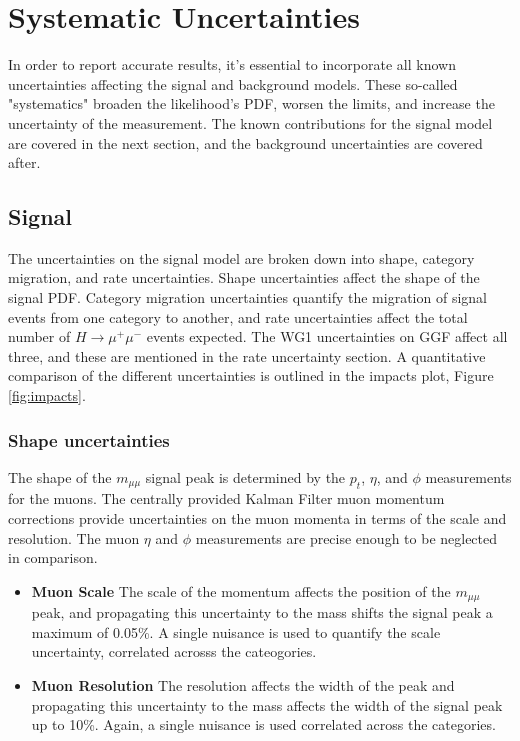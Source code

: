 \section{Systematic Uncertainties} \label{unc}
In order to report accurate results, it's essential to incorporate all known uncertainties affecting the signal and background models. These so-called "systematics" broaden the likelihood's PDF, worsen the limits, and increase the uncertainty of the measurement. The known contributions for the signal model are covered in the next section, and the background uncertainties are covered after. 
\subsection{Signal}
The uncertainties on the signal model are broken down into shape, category migration, and rate uncertainties. Shape uncertainties affect the shape of the signal PDF. Category migration uncertainties quantify the migration of signal events from one category to another, and rate uncertainties affect the total number of $H\rightarrow\mu^+\mu^-$ events expected. The WG1 uncertainties on GGF affect all three, and these are mentioned in the rate uncertainty section. A quantitative comparison of the different uncertainties is outlined in the impacts plot, Figure \ref{fig:impacts}. 

\subsubsection{Shape uncertainties}
The shape of the $m_{\mu\mu}$ signal peak is determined by the $p_t$, $\eta$, and $\phi$ measurements for the muons. The centrally provided Kalman Filter muon momentum corrections provide uncertainties on the muon momenta in terms of the scale and resolution. The muon $\eta$ and $\phi$ measurements are precise enough to be neglected in comparison.

\begin{itemize}
    \item {\bf Muon Scale} The scale of the momentum affects the position of the $m_{\mu\mu}$ peak, and propagating this uncertainty to the mass shifts the signal peak a maximum of 0.05\%. A single nuisance is used to quantify the scale uncertainty, correlated acrosss the cateogories.
    \item {\bf Muon Resolution} The resolution affects the width of the peak and propagating this uncertainty to the mass affects the width of the signal peak up to 10\%. Again, a single nuisance is used correlated across the categories.
\end{itemize}

